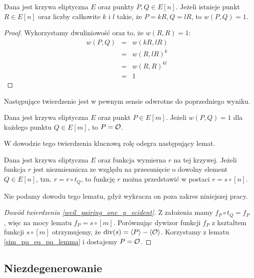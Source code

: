 \begin{theorem}
Dana jest krzywa eliptyczna $E$ oraz punkty $P, Q \in E[n]$.
Jeżeli istnieje punkt $R \in E[n]$ oraz liczby całkowite $k$ i $l$
takie, że $P = kR, Q = lR$, to $w(P, Q) = 1$.
\end{theorem}

\begin{proof}
Wykorzystamy dwuliniowość oraz to, że $w(R, R) = 1$:
\begin{eqnarray*}
w(P, Q)
& = & w(kR, lR) \\
& = & w(R, lR)^k \\
& = & w(R, R)^{kl} \\
& = & 1
\end{eqnarray*}
\end{proof}

Następujące twierdzenie jest w pewnym sensie odwrotne do poprzedniego wyniku.

\begin{theorem}\label{weil_pairing_one_p_ecident}
Dana jest krzywa eliptyczna $E$ oraz punkt $P \in E[m]$.
Jeżeli $w(P, Q) = 1$ dla każdego punktu $Q \in E[m]$, to $P = \mathcal{O}$.
\end{theorem}

W dowodzie tego twierdzenia kluczową rolę odegra następujący lemat.

\begin{lemma}
Dana jest krzywa eliptyczna $E$ oraz funkcja wymierna $r$ na tej krzywej.
Jeżeli funkcja $r$ jest niezmiennicza ze względu na przesunięcie
o dowolny element $Q \in E[n]$, tzn. $r = r \circ t_Q$,
to funkcję $r$ można przedstawić w postaci $r = s \circ [n]$.
\end{lemma}

Nie podamy dowodu tego lematu, gdyż wykracza on poza zakres niniejszej pracy.

\begin{proof}[Dowód twierdzenia \ref{weil_pairing_one_p_ecident}]
Z założenia mamy $f_P \circ t_Q = f_P$,
więc na mocy lematu $f_P = s \circ [m]$.
Porównując dywizor funkcji $f_P$ z kształtem funkcji $s \circ [m]$
otrzymujemy, że $\operatorname{div}(s) = \left\langle P\right\rangle - \left\langle\mathcal{O}\right\rangle$.
Korzystamy z lematu \ref{sim_pq_eq_pq_lemma} i dostajemy $P = \mathcal{O}$.
\end{proof}

\subsection*{Niezdegenerowanie}

